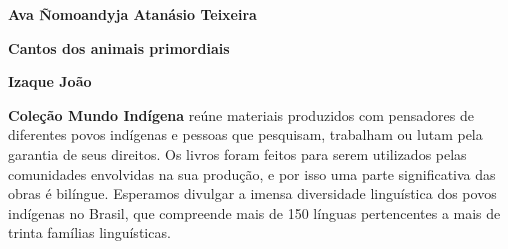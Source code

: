 \textbf{Ava Ñomoandyja Atanásio Teixeira} \lipsum[1]

\textbf{Cantos dos animais primordiais} \lipsum[2]

\textbf{Izaque João} \lipsum[3]

\textbf{Coleção Mundo Indígena} reúne materiais produzidos com pensadores de diferentes povos indígenas e pessoas que pesquisam, trabalham ou lutam pela garantia de seus direitos. Os livros foram feitos para serem utilizados pelas comunidades envolvidas na sua produção, e por isso uma parte significativa das obras é bilíngue. Esperamos divulgar a imensa diversidade linguística dos povos indígenas no Brasil, que compreende mais de 150 línguas pertencentes a mais de trinta famílias linguísticas.



